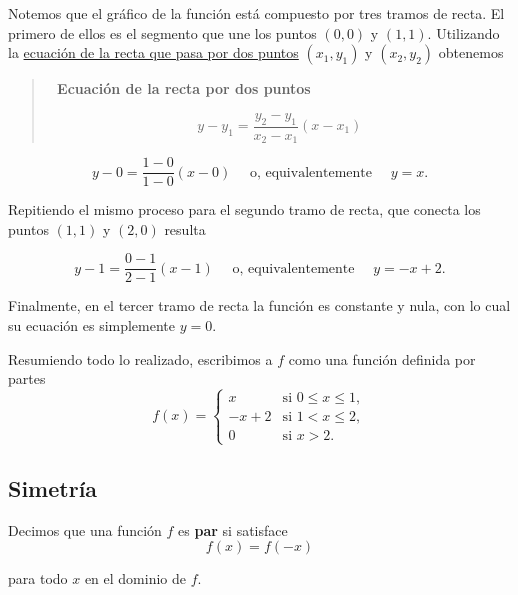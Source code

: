 \documentclass[
  letterpaper,
]{book}
\theoremstyle{plain}
\theoremstyle{remark}
\begin{document}
\begin{tcolorbox}[enhanced jigsaw, opacityback=0, left=2mm, opacitybacktitle=0.6, toprule=.15mm, bottomrule=.15mm, colbacktitle=quarto-callout-tip-color!10!white, titlerule=0mm, bottomtitle=1mm, title=\textcolor{quarto-callout-tip-color}{\faLightbulb}\hspace{0.5em}{Solución}, toptitle=1mm, colframe=quarto-callout-tip-color-frame, colback=white, breakable, rightrule=.15mm, arc=.35mm, leftrule=.75mm, coltitle=black]

Notemos que el gráfico de la función está compuesto por tres tramos de
recta. El primero de ellos es el segmento que une los puntos \((0,0)\) y
\((1,1)\). Utilizando la \hyperref[recta-dos-puntos]{ecuación de la
recta que pasa por dos puntos} \((x_1,y_1)\) y \((x_2,y_2)\) obtenemos

\label{recta-dos-puntos}
\begin{quote}
\textbf{📐 Ecuación de la recta por dos puntos}

\[
y-y_1=\frac{y_2-y_1}{x_2-x_1}(x-x_1)
\]
\end{quote}

\[
y-0=\frac{1-0}{1-0}(x-0) \quad \text{ o, equivalentemente }\quad  y=x. 
\]

Repitiendo el mismo proceso para el segundo tramo de recta, que conecta
los puntos \((1,1)\) y \((2,0)\) resulta

\[
y-1=\frac{0-1}{2-1}(x-1) \quad \text{ o, equivalentemente }\quad  y=-x+2. 
\]

Finalmente, en el tercer tramo de recta la función es constante y nula,
con lo cual su ecuación es simplemente \(y=0\).

Resumiendo todo lo realizado, escribimos a \(f\) como una función
definida por partes \[
f(x)=\begin{cases}
x & \text{si } 0\leq x\leq 1,\\
-x+2 & \text{si } 1<x\leq 2,\\
0 & \text{si } x>2.
\end{cases}
\]

\end{tcolorbox}

\subsection{Simetría}\label{simetruxeda}

\begin{tcolorbox}[enhanced jigsaw, opacityback=0, left=2mm, opacitybacktitle=0.6, toprule=.15mm, bottomrule=.15mm, colbacktitle=quarto-callout-note-color!10!white, titlerule=0mm, bottomtitle=1mm, title=\textcolor{quarto-callout-note-color}{\faInfo}\hspace{0.5em}{Definición (Función par)}, toptitle=1mm, colframe=quarto-callout-note-color-frame, colback=white, breakable, rightrule=.15mm, arc=.35mm, leftrule=.75mm, coltitle=black]

Decimos que una función \(f\) es \textbf{par} si satisface
\[f(x)=f(-x)\]

para todo \(x\) en el dominio de \(f\).

\end{tcolorbox}
\end{document}

